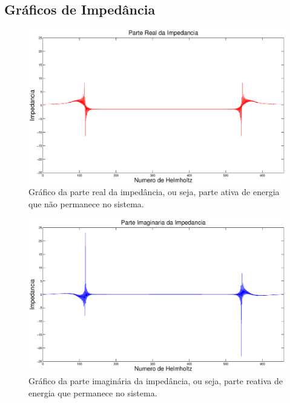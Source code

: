 \subsection{Gráficos de Impedância}
\begin{figure}[h!]
    \centering
 	\hspace{-1.5cm}
    \includegraphics[width=1\textwidth]{code_matlab/code_refactored/closed-opened/parte_real_ativa.eps}
    \caption{Gráfico da parte real da impedância, ou seja, parte ativa de energia que não permanece no sistema.}
    \label{fig8}
\end{figure}
\begin{figure}[h!]
    \centering
 	\hspace{-1.5cm}
    \includegraphics[width=1\textwidth]{code_matlab/code_refactored/closed-opened/parte_imaginaria_reativa.eps}
    \caption{Gráfico da parte imaginária da impedância, ou seja, parte reativa de energia que permanece no sistema.}
    \label{fig9}
\end{figure}

